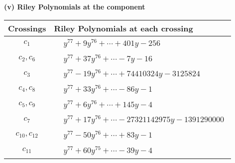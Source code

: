\documentclass[1p]{elsarticle_modified}
\theoremstyle{definition}
\begin{document}
\newpage\renewcommand{\arraystretch}{1}
\flushleft \textbf{(v) Riley Polynomials at the component}\newline \\
\begin{tabular}{m{50pt}|m{274pt}}
Crossings & \hspace{64pt}Riley Polynomials at each crossing \\
\hline $$\begin{aligned}c_{1}\end{aligned}$$&$\begin{aligned}
&y^{77}+9 y^{76}+\cdots+401 y-256
\end{aligned}$\\
\hline $$\begin{aligned}c_{2},c_{6}\end{aligned}$$&$\begin{aligned}
&y^{77}+37 y^{76}+\cdots-7 y-16
\end{aligned}$\\
\hline $$\begin{aligned}c_{3}\end{aligned}$$&$\begin{aligned}
&y^{77}-19 y^{76}+\cdots+74410324 y-3125824
\end{aligned}$\\
\hline $$\begin{aligned}c_{4},c_{8}\end{aligned}$$&$\begin{aligned}
&y^{77}+33 y^{76}+\cdots-86 y-1
\end{aligned}$\\
\hline $$\begin{aligned}c_{5},c_{9}\end{aligned}$$&$\begin{aligned}
&y^{77}+6 y^{76}+\cdots+145 y-4
\end{aligned}$\\
\hline $$\begin{aligned}c_{7}\end{aligned}$$&$\begin{aligned}
&y^{77}+17 y^{76}+\cdots-27321142975 y-1391290000
\end{aligned}$\\
\hline $$\begin{aligned}c_{10},c_{12}\end{aligned}$$&$\begin{aligned}
&y^{77}-50 y^{76}+\cdots+83 y-1
\end{aligned}$\\
\hline $$\begin{aligned}c_{11}\end{aligned}$$&$\begin{aligned}
&y^{77}+60 y^{75}+\cdots-39 y-4
\end{aligned}$\\
\hline
\end{tabular}\\~\\
\end{document}
